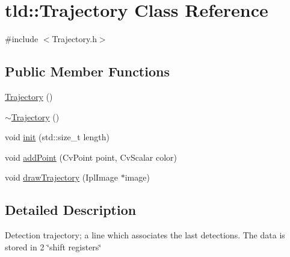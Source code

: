 \hypertarget{classtld_1_1_trajectory}{
\section{tld::Trajectory Class Reference}
\label{classtld_1_1_trajectory}
}


{\ttfamily \#include $<$Trajectory.h$>$}

\subsection*{Public Member Functions}
\begin{DoxyCompactItemize}
\item 
\hyperlink{classtld_1_1_trajectory_ab6baa664e2ea39e5ec0075f525a466ba}{Trajectory} ()
\item 
\hyperlink{classtld_1_1_trajectory_add295e2524012793dd3040fe098ddf65}{$\sim$Trajectory} ()
\item 
void \hyperlink{classtld_1_1_trajectory_a635927cb2bca22f884ddc00a0e18b6d7}{init} (std::size\_\-t length)
\item 
void \hyperlink{classtld_1_1_trajectory_a28a92000e31f71ce0831d72b068ae97b}{addPoint} (CvPoint point, CvScalar color)
\item 
void \hyperlink{classtld_1_1_trajectory_af8a0ffc5eb86050e0d26c766e4b2098d}{drawTrajectory} (IplImage $\ast$image)
\end{DoxyCompactItemize}


\subsection{Detailed Description}
Detection trajectory; a line which associates the last detections. The data is stored in 2 \char`\"{}shift registers\char`\"{} 

